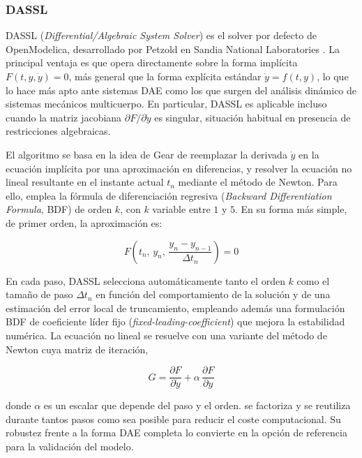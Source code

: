 \subsubsection*{DASSL}

DASSL (\textit{Differential/Algebraic System Solver}) es el solver por defecto de OpenModelica, desarrollado por Petzold en Sandia National Laboratories \cite{petzold1982}. La principal ventaja es que opera directamente sobre la forma implícita  $F(t, y, \dot{y}) = 0$, más general que la forma explícita estándar $\dot{y} = f(t, y)$, lo que lo hace más apto ante sistemas DAE como los que surgen del análisis dinámico de sistemas mecánicos multicuerpo. En particular, DASSL es aplicable incluso  cuando la matriz jacobiana $\partial F / \partial \dot{y}$ es singular, situación habitual en presencia de restricciones algebraicas.


El algoritmo se basa en la idea de Gear de reemplazar la derivada $\dot{y}$ en la ecuación implícita por una aproximación en diferencias, y resolver la ecuación no lineal resultante en el instante actual $t_n$ mediante el método de Newton. Para ello, emplea la fórmula de diferenciación regresiva (\textit{Backward Differentiation Formula}, BDF) de orden $k$, con $k$ variable entre $1$ y $5$. En su forma más simple, de primer orden, la aproximación es:

\begin{equation}
	F\!\left(t_n,\, y_n,\, \frac{y_n - y_{n-1}}{\Delta t_n}\right) = 0
\end{equation}

En cada paso, DASSL selecciona automáticamente tanto el orden $k$ como el tamaño de paso $\Delta t_n$ en función del comportamiento de la solución y de una estimación del error local de truncamiento, empleando además una formulación BDF de coeficiente líder fijo (\textit{fixed-leading-coefficient}) que mejora la estabilidad numérica. La ecuación no lineal se resuelve con una variante del método de Newton cuya matriz de iteración,

\begin{equation}
	G = \frac{\partial F}{\partial \dot{y}} + \alpha\, \frac{\partial F}{\partial y}
\end{equation}

donde $\alpha$ es un escalar que depende del paso y el orden. se factoriza y se reutiliza durante tantos pasos como sea posible para reducir el coste computacional. Su robustez frente a la forma DAE completa lo convierte en la opción de referencia para la validación del modelo.

